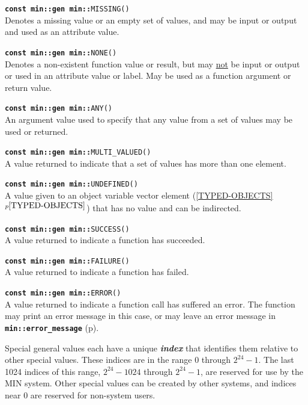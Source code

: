 \documentclass[12pt]{article}
\makeatletter
\newcommand{\TT}[1]{{\tt \bfseries #1}}
\newcommand{\ikey}[2]{{\bf \em #1}\index{#2}}
\newcommand{\ttindex}[1]{\index{#1@{\tt #1}}}
\newcommand{\minindex}[1]{\ttindex{min::#1}\ttindex{#1}}
\newcommand{\itemref}[1]{\ref{#1}$^{p\pageref{#1}}$}
\newcommand{\pagref}[1]{p\pageref{#1}}
\newcommand{\EOL}{\penalty \exhyphenpenalty}
\newenvironment{indpar}[1][0.3in]%
	{\begin{list}{}%
		     {\setlength{\itemsep}{0in}%
		      \setlength{\topsep}{0in}%
		      \setlength{\parsep}{1ex}%
		      \setlength{\labelwidth}{#1}%
		      \setlength{\leftmargin}{#1}%
		      \addtolength{\leftmargin}{\labelsep}}%
	 \item}%
	{\end{list}}
\newcommand{\LABEL}[1]{\label{#1}}
\newcommand{\MINNBKEY}[1]{{\tt #1}\minindex{#1}}
\makeatother
\begin{document}
\begin{indpar}
\begin{list}{}{}
\item[\TT{const min::gen min::}\MINNBKEY{MISSING()}]~%
	\LABEL{MIN::MISSING}\\
Denotes a missing value or an empty set of values, and may be input
or output and used as an attribute value.
\item[\TT{const min::gen min::}\MINNBKEY{NONE()}]~%
	\LABEL{MIN::NONE}\\
Denotes a non-existent function value or result, but may \underline{not} be
input or output or used in an attribute value or label.  May be used
as a function argument or return value.
\item[\TT{const min::gen min::}\MINNBKEY{ANY()}]~%
	\LABEL{MIN::ANY}\\
An argument value used to specify that any value from a set of values may be
used or returned.
\item[\TT{const min::gen min::}\MINNBKEY{MULTI\_VALUED()}]~%
	\LABEL{MIN::MULTI_VALUED}\\
A value returned to indicate that
a set of values has more than one element.
\item[\TT{const min::gen min::}\MINNBKEY{UNDEFINED()}]~%
	\LABEL{MIN::UNDEFINED}\\
A value given to an object variable vector element
(\itemref{TYPED-OBJECTS}) that has no value and can be indirected.
\item[\TT{const min::gen min::}\MINNBKEY{SUCCESS()}]~%
	\LABEL{MIN::SUCCESS}\\
A value returned to indicate a function has succeeded.
\item[\TT{const min::gen min::}\MINNBKEY{FAILURE()}]~%
	\LABEL{MIN::FAILURE}\\
A value returned to indicate a function has failed.
\item[\TT{const min::gen min::}\MINNBKEY{ERROR()}]~%
	\LABEL{MIN::ERROR}\\
A value returned to indicate a function call has suffered an error.
The function may print an error message in
this case, or may leave an error message in
\TT{min::\EOL error\_\EOL message} (\pagref{ERROR_MESSAGE}).
\end{list}
\end{indpar}

Special general values each have a unique \ikey{index}{of special value}
that identifies them relative to other special values.  These
indices are in the range $0$ through $2^{24}-1$.  The last 1024 indices of this
range, $2^{24}-1024$ through $2^{24}-1$, are reserved for use by the MIN
system.  Other special values can be created by other systems,
and indices near 0 are reserved for non-system users.
\end{document}
